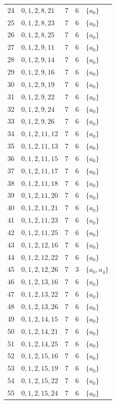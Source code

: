 \documentclass[10pt]{article}
\begin{document}
\begin{longtable}{@{}r l c c l@{}}
24 & $0,1,2,8,21$ & 7 & 6 & $\{a_{0}\}$\\
25 & $0,1,2,8,23$ & 7 & 6 & $\{a_{0}\}$\\
26 & $0,1,2,8,25$ & 7 & 6 & $\{a_{0}\}$\\
27 & $0,1,2,9,11$ & 7 & 6 & $\{a_{0}\}$\\
28 & $0,1,2,9,14$ & 7 & 6 & $\{a_{0}\}$\\
29 & $0,1,2,9,16$ & 7 & 6 & $\{a_{0}\}$\\
30 & $0,1,2,9,19$ & 7 & 6 & $\{a_{0}\}$\\
31 & $0,1,2,9,22$ & 7 & 6 & $\{a_{0}\}$\\
32 & $0,1,2,9,24$ & 7 & 6 & $\{a_{0}\}$\\
33 & $0,1,2,9,26$ & 7 & 6 & $\{a_{0}\}$\\
34 & $0,1,2,11,12$ & 7 & 6 & $\{a_{0}\}$\\
35 & $0,1,2,11,13$ & 7 & 6 & $\{a_{0}\}$\\
36 & $0,1,2,11,15$ & 7 & 6 & $\{a_{0}\}$\\
37 & $0,1,2,11,17$ & 7 & 6 & $\{a_{0}\}$\\
38 & $0,1,2,11,18$ & 7 & 6 & $\{a_{0}\}$\\
39 & $0,1,2,11,20$ & 7 & 6 & $\{a_{0}\}$\\
40 & $0,1,2,11,21$ & 7 & 6 & $\{a_{0}\}$\\
41 & $0,1,2,11,23$ & 7 & 6 & $\{a_{0}\}$\\
42 & $0,1,2,11,25$ & 7 & 6 & $\{a_{0}\}$\\
43 & $0,1,2,12,16$ & 7 & 6 & $\{a_{0}\}$\\
44 & $0,1,2,12,22$ & 7 & 6 & $\{a_{0}\}$\\
45 & $0,1,2,12,26$ & 7 & 3 & $\{a_{0},a_{4}\}$\\
46 & $0,1,2,13,16$ & 7 & 6 & $\{a_{0}\}$\\
47 & $0,1,2,13,22$ & 7 & 6 & $\{a_{0}\}$\\
48 & $0,1,2,13,26$ & 7 & 6 & $\{a_{0}\}$\\
49 & $0,1,2,14,15$ & 7 & 6 & $\{a_{0}\}$\\
50 & $0,1,2,14,21$ & 7 & 6 & $\{a_{0}\}$\\
51 & $0,1,2,14,25$ & 7 & 6 & $\{a_{0}\}$\\
52 & $0,1,2,15,16$ & 7 & 6 & $\{a_{0}\}$\\
53 & $0,1,2,15,19$ & 7 & 6 & $\{a_{0}\}$\\
54 & $0,1,2,15,22$ & 7 & 6 & $\{a_{0}\}$\\
55 & $0,1,2,15,24$ & 7 & 6 & $\{a_{0}\}$\\

\end{longtable}
\end{document}
